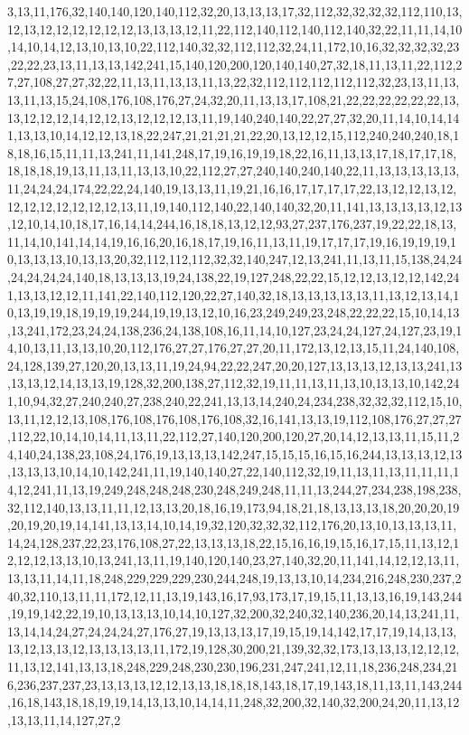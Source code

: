 3,13,11,176,32,140,140,120,140,112,32,20,13,13,13,17,32,112,32,32,32,32,112,110,13,12,13,12,12,12,12,12,12,13,13,13,12,11,22,112,140,112,140,112,140,32,22,11,11,14,10,14,10,14,12,13,10,13,10,22,112,140,32,32,112,112,32,24,11,172,10,16,32,32,32,32,23,22,22,23,13,11,13,13,142,241,15,140,120,200,120,140,140,27,32,18,11,13,11,22,112,27,27,108,27,27,32,22,11,13,11,13,13,11,13,22,32,112,112,112,112,112,32,23,13,11,13,13,11,13,15,24,108,176,108,176,27,24,32,20,11,13,13,17,108,21,22,22,22,22,22,22,13,13,12,12,12,14,12,12,13,12,12,12,13,11,19,140,240,140,22,27,27,32,20,11,14,10,14,141,13,13,10,14,12,12,13,18,22,247,21,21,21,21,22,20,13,12,12,15,112,240,240,240,18,18,18,16,15,11,11,13,241,11,141,248,17,19,16,19,19,18,22,16,11,13,13,17,18,17,17,18,18,18,18,19,13,11,13,11,13,13,10,22,112,27,27,240,140,240,140,22,11,13,13,13,13,13,11,24,24,24,174,22,22,24,140,19,13,13,11,19,21,16,16,17,17,17,17,22,13,12,12,13,12,12,12,12,12,12,12,12,13,11,19,140,112,140,22,140,140,32,20,11,141,13,13,13,13,12,13,12,10,14,10,18,17,16,14,14,244,16,18,18,13,12,12,93,27,237,176,237,19,22,22,18,13,11,14,10,141,14,14,19,16,16,20,16,18,17,19,16,11,13,11,19,17,17,17,19,16,19,19,19,10,13,13,13,10,13,13,20,32,112,112,112,32,32,140,247,12,13,241,11,13,11,15,138,24,24,24,24,24,24,140,18,13,13,13,19,24,138,22,19,127,248,22,22,15,12,12,13,12,12,142,241,13,13,12,12,11,141,22,140,112,120,22,27,140,32,18,13,13,13,13,13,11,13,12,13,14,10,13,19,19,18,19,19,19,244,19,19,13,12,10,16,23,249,249,23,248,22,22,22,15,10,14,13,13,241,172,23,24,24,138,236,24,138,108,16,11,14,10,127,23,24,24,127,24,127,23,19,14,10,13,11,13,13,10,20,112,176,27,27,176,27,27,20,11,172,13,12,13,15,11,24,140,108,24,128,139,27,120,20,13,13,11,19,24,94,22,22,247,20,20,127,13,13,13,12,13,13,241,13,13,13,12,14,13,13,19,128,32,200,138,27,112,32,19,11,11,13,11,13,10,13,13,10,142,241,10,94,32,27,240,240,27,238,240,22,241,13,13,14,240,24,234,238,32,32,32,112,15,10,13,11,12,12,13,108,176,108,176,108,176,108,32,16,141,13,13,19,112,108,176,27,27,27,112,22,10,14,10,14,11,13,11,22,112,27,140,120,200,120,27,20,14,12,13,13,11,15,11,24,140,24,138,23,108,24,176,19,13,13,13,142,247,15,15,15,16,15,16,244,13,13,13,12,13,13,13,13,10,14,10,142,241,11,19,140,140,27,22,140,112,32,19,11,13,11,13,11,11,11,14,12,241,11,13,19,249,248,248,248,230,248,249,248,11,11,13,244,27,234,238,198,238,32,112,140,13,13,11,11,12,13,13,20,18,16,19,173,94,18,21,18,13,13,13,18,20,20,20,19,20,19,20,19,14,141,13,13,14,10,14,19,32,120,32,32,32,112,176,20,13,10,13,13,13,11,14,24,128,237,22,23,176,108,27,22,13,13,13,18,22,15,16,16,19,15,16,17,15,11,13,12,12,12,12,13,13,10,13,241,13,11,19,140,120,140,23,27,140,32,20,11,141,14,12,12,13,11,13,13,11,14,11,18,248,229,229,229,230,244,248,19,13,13,10,14,234,216,248,230,237,240,32,110,13,11,11,172,12,11,13,19,143,16,17,93,173,17,19,15,11,13,13,16,19,143,244,19,19,142,22,19,10,13,13,13,10,14,10,127,32,200,32,240,32,140,236,20,14,13,241,11,13,14,14,24,27,24,24,24,27,176,27,19,13,13,13,17,19,15,19,14,142,17,17,19,14,13,13,13,12,13,13,12,13,13,13,13,11,172,19,128,30,200,21,139,32,32,173,13,13,13,12,12,12,11,13,12,141,13,13,18,248,229,248,230,230,196,231,247,241,12,11,18,236,248,234,216,236,237,237,23,13,13,13,12,12,13,13,18,18,18,143,18,17,19,143,18,11,13,11,143,244,16,18,143,18,18,19,19,14,13,13,10,14,14,11,248,32,200,32,140,32,200,24,20,11,13,12,13,13,11,14,127,27,2